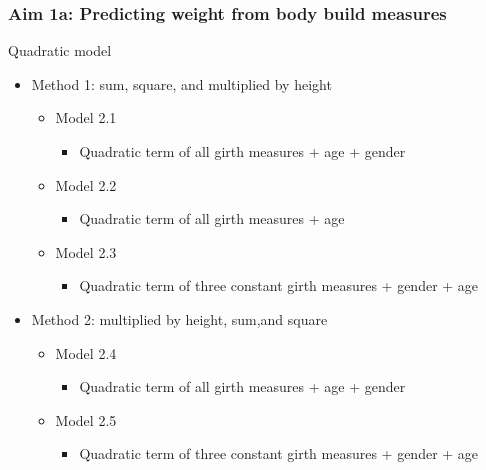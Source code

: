 \documentclass{beamer}
\begin{document}
\begin{frame}
\frametitle{Aim 1a: Predicting weight from body build measures}

Quadratic model 
\begin{itemize}
	\item Method 1: sum, square, and multiplied by height
	\begin{itemize}
		\item Model 2.1 
			\begin{itemize}
				\item Quadratic term of all girth measures + age + gender
			\end{itemize}
		\item Model 2.2
			\begin{itemize}
				\item Quadratic term of all girth measures + age
			\end{itemize}
		\item Model 2.3
			\begin{itemize}
				\item Quadratic term of three constant girth measures + gender + age
			\end{itemize}
	\end{itemize}
	\item Method 2: multiplied by height, sum,and square
	\begin{itemize}
		\item Model 2.4
			\begin{itemize}
				\item Quadratic term of all girth measures + age + gender
			\end{itemize}
		\item Model 2.5
			\begin{itemize}
				\item Quadratic term of three constant girth measures + gender + age
			\end{itemize}
	\end{itemize}
\end{itemize}


\end{frame}
\end{document}
